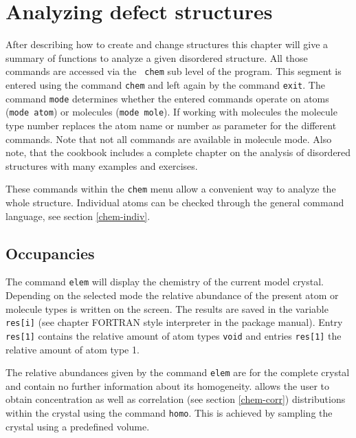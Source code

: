
\chapter{Analyzing defect structures \label{chem}}

After describing how to create and change structures this chapter
will give a summary of \Discus functions to analyze a given
disordered structure. All those commands are accessed via the {\tt
chem} sub level of the program. This segment is entered using the
command {\tt chem} and left again by the command {\tt exit}. The
command {\tt mode} determines whether the entered commands operate
on atoms ({\tt mode atom}) or molecules ({\tt mode mole}). If
working with molecules the molecule type number replaces the atom
name or number as parameter for the different commands. Note that
not all commands are available in molecule mode. Also note, that the
\Discus cookbook \citep{nedpro} includes a complete chapter on
the analysis of disordered structures with many examples and
exercises.

These commands within the {\tt chem} menu allow a convenient way to 
analyze the whole structure. Individual atoms can be checked through
the general command language, see section \ref{chem-indiv}.

\section{Occupancies \label{chem-occ}}

The command {\tt elem} will display the chemistry of the current
model crystal. Depending on the selected mode the relative abundance
of the present atom or molecule types is written on the screen. The
results are saved in the variable {\tt res[i]} (see chapter
FORTRAN style interpreter in the package manual). Entry {\tt res[1]}
contains the relative amount of atom types {\tt void} and entries 
{\tt res[1]} the relative amount of atom type 1.

The relative abundances given by the command
{\tt elem} are for the complete crystal and contain no further
information about its homogeneity. \Discus allows the user to
obtain concentration as well as correlation (see section
\ref{chem-corr}) distributions within the crystal using the command
{\tt homo}. This is achieved by sampling the crystal using a
predefined volume.

